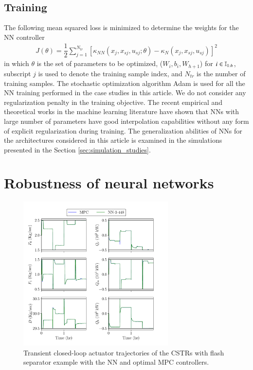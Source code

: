 \documentclass[preprint,5p, twocolumn, authoryear]{elsarticle}
\begin{document}
\subsection{Training}
The following mean squared loss is minimized to determine the weights for the NN
controller
\begin{align}
    J (\theta) = \dfrac{1}{2}\sum_{j=1}^{N_{tr}} 
[\kappa_{NN}(x_j, x_{sj}, u_{sj}; \theta) - \kappa_N(x_j, x_{sj}, u_{sj})]^2 
\end{align}
in which $\theta$ is the set of parameters to be optimized, ($W_i, b_i,
W_{h+1}$) for $i \in \mathbb{I}_{1:h}$, subscript $j$ is used to denote the training
sample index, and $N_{tr}$ is the number of training samples. The stochastic
optimization algorithm Adam \citep*{kingma:ba:2014} is used for all the NN
training performed in the case studies in this article. We do not consider any
regularization penalty in the training objective. The recent empirical and
theoretical works in the machine learning literature have shown that NNs with
large number of parameters have good interpolation capabilities
\citep*{belkin:hsu:ma:mandal:2019, zhang:bengio:hardt:recht:vinyals:2017,
arora:simon:hu:li:wang:2019, allen-zhu:li:liang:2019} without any form of
explicit regularization during training. The generalization abilities of NNs for
the architectures considered in this article is examined in the simulations
presented in the Section \ref{sec:simulation_studies}.

\section{Robustness of neural networks} \label{sec:robustness}

\begin{figure}[!h]
    \centering
	\includegraphics[page=1, width=0.7\textwidth,
		height=0.5\textheight]{cstrs_comparision_plots.pdf}    
        \caption{Transient closed-loop actuator trajectories of the CSTRs with
        flash separator example with the NN and optimal MPC controllers.}   
    \label{fig:cl_cstrs_inputs}
\end{figure}
\end{document}
